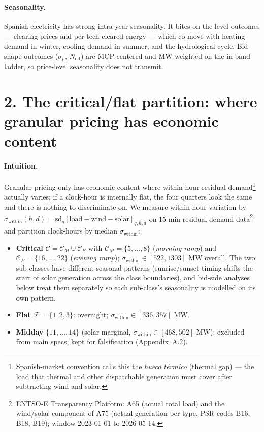 \documentclass[11pt]{article}
\begin{document}
\paragraph{Seasonality.} Spanish electricity has strong intra-year seasonality. It bites on the level outcomes --- clearing prices and per-tech cleared energy --- which co-move with heating demand in winter, cooling demand in summer, and the hydrological cycle. Bid-shape outcomes ($\sigma_p$, $N_{\text{eff}}$) are MCP-centered and MW-weighted on the in-band ladder, so price-level seasonality does not transmit.
\vspace{6pt}

\section*{2. The critical/flat partition: where granular pricing has economic content}
\label{sec:partition}

\paragraph{Intuition.} Granular pricing only has economic content where within-hour residual demand\footnote{Spanish-market convention calls this the \emph{hueco t\'ermico} (thermal gap) --- the load that thermal and other dispatchable generation must cover after subtracting wind and solar.} actually varies; if a clock-hour is internally flat, the four quarters look the same and there is nothing to discriminate on. We measure within-hour variation by $\sigma_{\text{within}}(h,d) = \mathrm{sd}_q[\text{load}-\text{wind}-\text{solar}]_{q,h,d}$ on 15-min residual-demand data\footnote{ENTSO-E Transparency Platform: A65 (actual total load) and the wind/solar component of A75 (actual generation per type, PSR codes B16, B18, B19); window 2023-01-01 to 2026-05-14.} and partition clock-hours by median $\sigma_{\text{within}}$:
\begin{itemize}\setlength{\itemsep}{1pt}
\item \textbf{Critical} $\mathcal{C}=\mathcal{C}_M\cup\mathcal{C}_E$ with $\mathcal{C}_M=\{5,\dots,8\}$ (\emph{morning ramp}) and $\mathcal{C}_E=\{16,\dots,22\}$ (\emph{evening ramp}); $\sigma_{\text{within}}\in[522,1303]$ MW overall. The two sub-classes have different seasonal patterns (sunrise/sunset timing shifts the start of solar generation across the class boundaries), and bid-side analyses below treat them separately so each sub-class's seasonality is modelled on its own pattern.
\item \textbf{Flat} $\mathcal{F}=\{1,2,3\}$: overnight; $\sigma_{\text{within}}\in[336,357]$ MW.
\item \textbf{Midday} $\{11,\dots,14\}$ (solar-marginal, $\sigma_{\text{within}}\in[468,502]$ MW): excluded from main specs; kept for falsification (\hyperref[sec:5a]{Appendix~A.2}).
\end{itemize}
\end{document}
